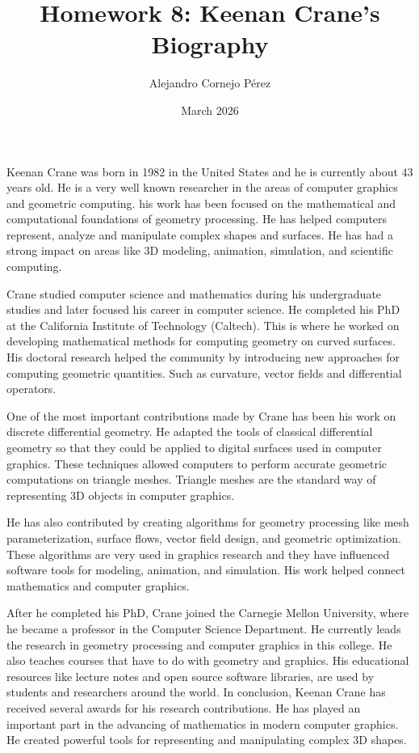 \documentclass[11pt]{article}
\title{Homework 8: Keenan Crane's Biography}
\author{Alejandro Cornejo Pérez}
\date{March 2026}
\begin{document}
\maketitle
Keenan Crane was born in 1982 in the United States and he is currently about 43 years old. He is a very well known researcher in the areas of computer graphics and geometric computing. his work has been focused on the mathematical and computational foundations of geometry processing. He has helped computers represent, analyze and manipulate complex shapes and surfaces. He has had a strong impact on areas like 3D modeling, animation, simulation, and scientific computing.

Crane studied computer science and mathematics during his undergraduate studies and later focused his career in computer science. He completed his PhD at the California Institute of Technology (Caltech). This is where he worked on developing mathematical methods for computing geometry on curved surfaces. His doctoral research helped the community by introducing new approaches for computing geometric quantities. Such as curvature, vector fields and differential operators.

One of the most important contributions made by Crane has been his work on discrete differential geometry. He adapted the tools of classical differential geometry so that they could be applied to digital surfaces used in computer graphics. These techniques allowed computers to perform accurate geometric computations on triangle meshes. Triangle meshes are the standard way of representing 3D objects in computer graphics.

He has also contributed by creating algorithms for geometry processing like mesh parameterization, surface flows, vector field design, and geometric optimization. These algorithms are very used in graphics research and they have influenced software tools for modeling, animation, and simulation. His work helped connect mathematics and computer graphics.

After he completed his PhD, Crane joined the Carnegie Mellon University, where he became a professor in the Computer Science Department. He currently leads the research in geometry processing and computer graphics in this college. He also teaches courses that have to do with geometry and graphics. His educational resources like lecture notes and open source software libraries, are used by students and researchers around the world. In conclusion, Keenan Crane has received several awards for his research contributions. He has played an important part in the advancing of mathematics in modern computer graphics. He created powerful tools for representing and manipulating complex 3D shapes.
\end{document}
